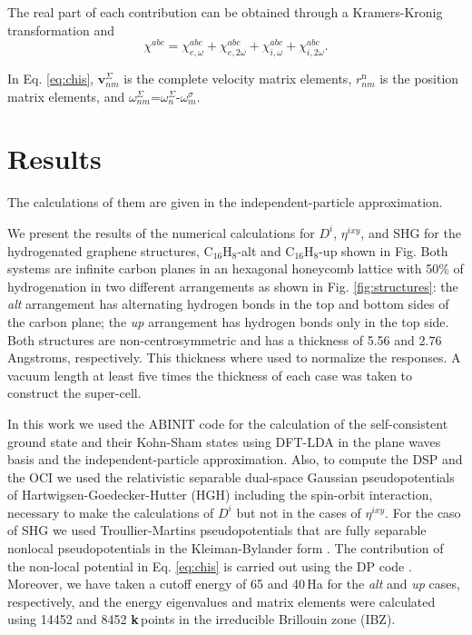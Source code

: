 \documentclass[pss]{wiley2sp} %
\begin{document}
The real part of each contribution can be obtained through a Kramers-Kronig transformation \cite{tancogne2014effect} and
\begin{equation}\label{eq:chitotal}
    \chi^{abc} = \chi^{abc}_{e,\omega} + \chi^{abc}_{e,2\omega} +
    \chi^{abc}_{i,\omega} + \chi^{abc}_{i,2\omega}
    .
\end{equation}

In Eq. \ref{eq:chis}, $\mathbf{v}^{\Sigma}_{nm}$ is the complete velocity matrix elements, $r^{\mathrm{n}}_{nm}$ is the position matrix elements, and $\omega^\Sigma_{nm}$=$\omega^{\Sigma}_{n}$-$\omega^{\sigma}_{m}$.


\section{Results}\label{sec:results}

\begin{changed}
The calculations of them are given in the independent-particle approximation.
\end{changed}

We present the results of the numerical calculations for {$D^{i}$}, {$\eta^{ixy}$}, and SHG for
the hydrogenated graphene structures, C$_{16}$H$_{8}$-alt and C$_{16}$H$_{8}$-up shown in Fig. 
Both systems are infinite carbon planes in an
hexagonal honeycomb lattice with 50\% of hydrogenation in two different
arrangements as shown in Fig. \ref{fig:structures}: the \emph{alt} arrangement has
alternating hydrogen bonds in the top and bottom sides of the carbon plane; the
\emph{up} arrangement has hydrogen bonds only in the top
side. Both structures are non-centrosymmetric and has a thickness of 5.56 and
2.76 Angstroms, respectively. This thickness where used to normalize the responses. A vacuum length at least  five times the
thickness of each case was taken to construct the super-cell.


In this work we used the ABINIT code \cite{torrent2008implementation} for the
calculation of the self-consistent ground state and their Kohn-Sham states
using DFT-LDA in the plane waves basis and the independent-particle approximation. Also, to compute the DSP
and the OCI we used the relativistic separable dual-space Gaussian
pseudopotentials of Hartwigsen-Goedecker-Hutter (HGH)
\cite{hartwigsen1998relativistic} including the spin-orbit interaction,
necessary to make the calculations of $D^{i} $ but not in the cases of {$\eta^{ixy}$}.
For the caso of SHG we used Troullier-Martins pseudopotentials
\cite{troullier1991efficient} that are fully separable nonlocal
pseudopotentials in the Kleiman-Bylander form \cite{kleinman1982efficacious}.
The contribution of the non-local potential in Eq. \ref{eq:chis} is carried out
using the DP code \cite{olevanoDP}. Moreover, we have taken a cutoff energy of
65 and 40\,Ha for the \emph{alt} and \emph{up} cases, respectively, and
the energy eigenvalues and matrix elements were calculated using 14452 and 8452
\textbf{k}\,points in the irreducible Brillouin zone (IBZ).
\end{document}
